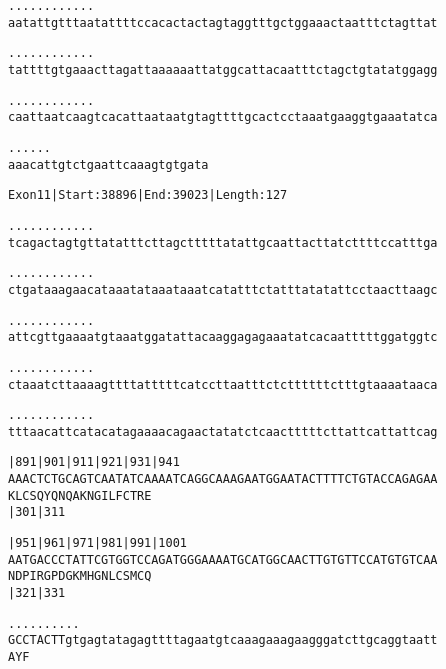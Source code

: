 \documentclass{article}
\begin{document}
\newpage
\begin{alltt}
  .    .    .    .    .    .    .    .    .    .    .    .
aatattgtttaatattttccacactactagtaggtttgctggaaactaatttctagttat



  .    .    .    .    .    .    .    .    .    .    .    .
tattttgtgaaacttagattaaaaaattatggcattacaatttctagctgtatatggagg



  .    .    .    .    .    .    .    .    .    .    .    .
caattaatcaagtcacattaataatgtagttttgcactcctaaatgaaggtgaaatatca



  .    .    .    .    .    .
aaacattgtctgaattcaaagtgtgata


\end{alltt}
\newpage
\begin{alltt}
Exon 11 | Start: 38896 | End: 39023 | Length: 127

.    .    .    .    .    .    .    .    .    .    .    .
tcagactagtgttatatttcttagctttttatattgcaattacttatcttttccatttga



.    .    .    .    .    .    .    .    .    .    .    .
ctgataaagaacataaatataaataaatcatatttctatttatatattcctaacttaagc



.    .    .    .    .    .    .    .    .    .    .    .
attcgttgaaaatgtaaatggatattacaaggagagaaatatcacaatttttggatggtc



.    .    .    .    .    .    .    .    .    .    .    .
ctaaatcttaaaagttttatttttcatccttaatttctcttttttctttgtaaaataaca



.    .    .    .    .    .    .    .    .    .    .    .
tttaacattcatacatagaaaacagaactatatctcaactttttcttattcattattcag



        |891      |901      |911      |921      |931      |941
AAACTCTGCAGTCAATATCAAAATCAGGCAAAGAATGGAATACTTTTCTGTACCAGAGAA
K  L  C  S  Q  Y  Q  N  Q  A  K  N  G  I  L  F  C  T  R  E
                  |301                          |311

        |951      |961      |971      |981      |991      |1001
AATGACCCTATTCGTGGTCCAGATGGGAAAATGCATGGCAACTTGTGTTCCATGTGTCAA
N  D  P  I  R  G  P  D  G  K  M  H  G  N  L  C  S  M  C  Q
                  |321                          |331

            .    .    .    .    .    .    .    .    .    .
GCCTACTTgtgagtatagagttttagaatgtcaaagaaagaagggatcttgcaggtaatt
A  Y  F


\end{alltt}
\end{document}

